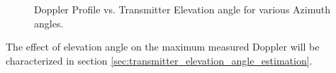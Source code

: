 \begin{figure}
{	}
\caption{Doppler Profile vs. Transmitter Elevation angle for various Azimuth angles.}
\label{fig:verify}
\end{figure}

The effect of elevation angle on the maximum measured Doppler will be characterized in section \ref{sec:transmitter_elevation_angle_estimation}.



